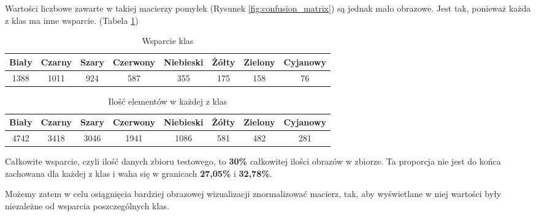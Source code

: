 Wartości liczbowe zawarte w takiej macierzy pomyłek (Rysunek \ref{fig:confusion_matrix}) są jednak mało obrazowe. Jest tak, ponieważ każda z klas ma inne wsparcie. (Tabela \ref{tab:support})

\begin{table}[h!]
\begin{center}
\begin{tabular}{|l|l|l|l|l|l|l|l|}
\hline
Biały                      & Czarny                    & Szary                    & Czerwony                 & Niebieski                & Żółty                    & Zielony                  & Cyjanowy                \\ \hline
\multicolumn{1}{|c|}{1388} & \multicolumn{1}{c|}{1011} & \multicolumn{1}{c|}{924} & \multicolumn{1}{c|}{587} & \multicolumn{1}{c|}{355} & \multicolumn{1}{c|}{175} & \multicolumn{1}{c|}{158} & \multicolumn{1}{c|}{76} \\ \hline
\end{tabular}
\caption{Wsparcie klas}
\label{tab:support}
\end{center}
\end{table}

\begin{table}[h!]
\begin{center}
\begin{tabular}{|c|c|c|c|c|c|c|c|}
\hline
Biały & Czarny & Szary & Czerwony & Niebieski & Żółty & Zielony & Cyjanowy \\ \hline
4742  & 3418   & 3046  & 1941     & 1086      & 581   & 482     & 281      \\ \hline
\end{tabular}
\caption{Ilość elementów w każdej z klas}
\label{tab:classes_count}
\end{center}
\end{table}

Całkowite wsparcie, czyli ilość danych zbioru testowego, to \textbf{30\%} całkowitej ilości obrazów w zbiorze. Ta proporcja nie jest do końca zachowana dla każdej z klas i waha się w granicach \textbf{27,05\%} i \textbf{32,78\%}.

Możemy zatem w celu osiągnięcia bardziej obrazowej wizualizacji znormalizować macierz, tak, aby wyświetlane w niej wartości były niezależne od wsparcia poszczególnych klas.

